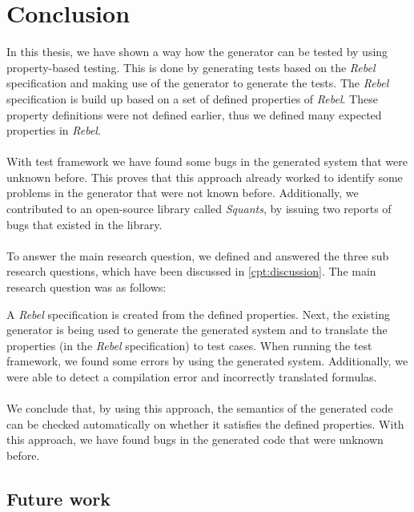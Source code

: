 \chapter{Conclusion}
\label{cpt:conclusion}
In this thesis, we have shown a way how the generator can be tested by using property-based testing. This is done by generating tests based on the \textit{Rebel} specification and making use of the generator to generate the tests. The \textit{Rebel} specification is build up based on a set of defined properties of \textit{Rebel}. These property definitions were not defined earlier, thus we defined many expected properties in \textit{Rebel}.\\
\\
With test framework we have found some bugs in the generated system that were unknown before. This proves that this approach already worked to identify some problems in the generator that were not known before. Additionally, we contributed to an open-source library called \textit{Squants}, by issuing two reports of bugs that existed in the library.\\
\\
To answer the main research question, we defined and answered the three sub research questions, which have been discussed in \autoref{cpt:discussion}. The main research question was as follows:
\begin{quote}
\rqMain
\end{quote}
A \textit{Rebel} specification is created from the defined properties. Next, the existing generator is being used to generate the generated system and to translate the properties (in the \textit{Rebel} specification) to test cases. When running the test framework, we found some errors by using the generated system. Additionally, we were able to detect a compilation error and incorrectly translated formulas.\\
\\
We conclude that, by using this approach, the semantics of the generated code can be checked automatically on whether it satisfies the defined properties. With this approach, we have found bugs in the generated code that were unknown before.

\section{Future work}

